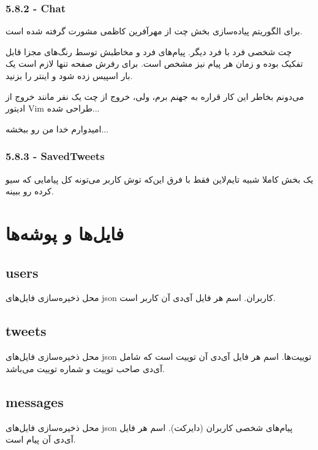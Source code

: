 \documentclass[12pt]{article}
\begin{document}
\LTR
\begin{latin}
\subsubsection*{5.8.2 - Chat}
\end{latin}
\RTL
برای الگوریتم پیاده‌سازی بخش چت از مهرآفرین کاظمی مشورت گرفته شده است.

چت شخصی فرد با فرد دیگر. پیام‌های فرد و مخاطبش توسط رنگ‌های مجزا قابل تفکیک بوده و زمان هر پیام نیز مشخص است. برای رفرش صفحه تنها لازم است یک بار اسپیس زده شود و اینتر را بزنید.

می‌دونم بخاطر این کار قراره به جهنم برم، ولی، خروج از چت یک نفر مانند خروج از ادیتور Vim طراحی شده...

امیدوارم خدا من رو ببخشه...

\LTR
\begin{latin}
\subsubsection*{5.8.3 - SavedTweets}
\end{latin}
\RTL
یک بخش کاملا شبیه تایم‌لاین فقط با فرق این‌که توش کاربر می‌تونه کل پیامایی که سیو کرده رو ببینه.

\section*{فایل‌ها و پوشه‌ها}

\LTR
\begin{latin}
\subsection*{users}
\end{latin}
\RTL
محل ذخیره‌سازی فایل‌های json کاربران. اسم هر فایل آی‌دی آن کاربر است.

\LTR
\begin{latin}
\subsection*{tweets}
\end{latin}
\RTL
محل ذخیره‌سازی فایل‌های json توییت‌ها. اسم هر فایل آی‌دی آن توییت است که شامل آی‌دی صاحب توییت و شماره توییت می‌باشد.

\LTR
\begin{latin}
\subsection*{messages}
\end{latin}
\RTL
محل ذخیره‌سازی فایل‌های json پیام‌های شخصی کاربران (دایرکت). اسم هر فایل آی‌دی آن پیام است.
\end{document}
